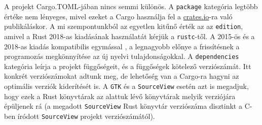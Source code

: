 


A projekt Cargo.TOML-jában nincs semmi különös.
A \texttt{package} kategória legtöbb értéke nem lényeges, mivel ezeket a Cargo használja fel
a \url{crates.io}-ra való publikáláskor.
A mi szempontunkból az egyetlen kitűnő érték az az \texttt{edition}, amivel a Rust 2018-as
kiadásának használatát kérjük a \texttt{rustc}-től.
A 2015-ös és a 2018-as kiadás kompatibilis egymással \cite{rust:editions},
a legnagyobb előnye a frissítésnek a programozás megkönnyítése az új nyelvi tulajdonságokkal.
A \texttt{dependencies} kategória leírja a projekt függőségeit, és a függőségek kötelező verziószámát.
Itt konkrét verziószámokat adtunk meg, de lehetőség van a Cargo-ra hagyni az optimális verziók kiderítését is.
A \texttt{GTK} és a \texttt{SourceView} esetén azt is megadjuk, 
hogy ezek a Rust könyvtárak az alattuk lévő könyvtárak melyik verziójára épüljenek rá
(a megadott \texttt{SourceView} Rust könyvtár verziószáma disztinkt a C-ben íródott \texttt{SourceView}
projekt verziószámától).
